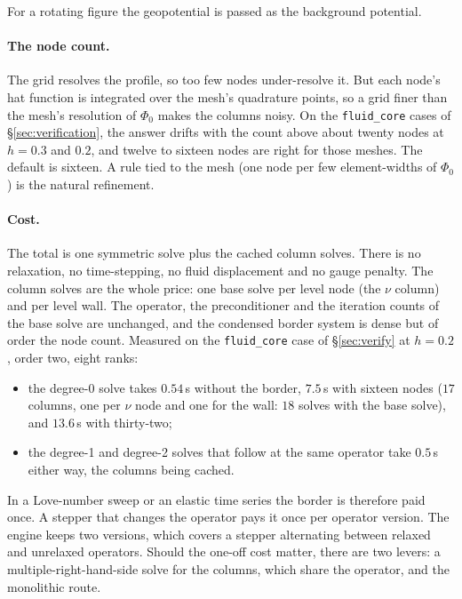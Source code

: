 \documentclass[11pt]{article}
\theoremstyle{definition}
\theoremstyle{remark}
\newcommand{\code}[1]{\texttt{#1}}
\begin{document}
For a rotating figure the geopotential is passed as the background
potential.

\paragraph{The node count.} The grid resolves the profile, so too few
nodes under-resolve it. But each node's hat function is integrated
over the mesh's quadrature points, so a grid finer than the mesh's
resolution of $\Phi_0$ makes the columns noisy. On the
\code{fluid\_core} cases of \S\ref{sec:verification}, the answer drifts
with the count above about twenty nodes at $h = 0.3$ and $0.2$, and
twelve to sixteen nodes are right for those meshes. The default is
sixteen. A rule tied to the mesh (one node per few element-widths of
$\Phi_0$) is the natural refinement.

\paragraph{Cost.} The total is one symmetric solve plus the cached
column solves. There is no relaxation, no time-stepping, no fluid
displacement and no gauge penalty. The column solves are the whole
price: one base solve per level node (the $\nu$ column) and per level
wall. The operator, the preconditioner and the iteration counts of the
base solve are unchanged, and the condensed border system is dense but
of order the node count. Measured on the \code{fluid\_core} case of
\S\ref{sec:verify} at $h = 0.2$, order two, eight ranks:
\begin{itemize}
\item the degree-0 solve takes $0.54\,$s without the border, $7.5\,$s
  with sixteen nodes ($17$ columns, one per $\nu$ node and one for the wall: $18$ solves with the base solve), and $13.6\,$s with thirty-two;
\item the degree-1 and degree-2 solves that follow at the same operator
  take $0.5\,$s either way, the columns being cached.
\end{itemize}
In a Love-number sweep or an elastic time series the border is
therefore paid once. A stepper that changes the operator pays it once
per operator version. The engine keeps two versions, which covers a
stepper alternating between relaxed and unrelaxed operators. Should
the one-off cost matter, there are two levers: a
multiple-right-hand-side solve for the columns, which share the
operator, and the monolithic route.
\end{document}
